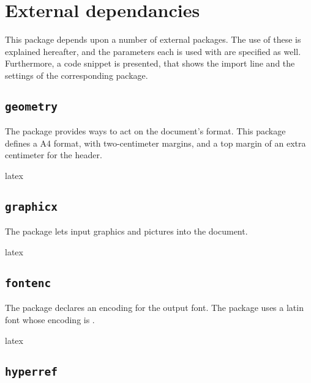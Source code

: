 \documentclass{report}
\begin{document}
\section{External dependancies}

This package depends upon a number of external packages.
The use of these is explained hereafter, and the parameters each is used with are specified as well.
Furthermore, a code snippet is presented, that shows the import line and the settings of the corresponding package.

\subsection{\texttt{geometry}}

The  package provides ways to act on the document's format.
This package defines a A4 format, with two-centimeter margins, and a top margin of an extra centimeter for the header.

\begin{imtaCode}{latex}
\RequirePackage[a4paper, margin=2cm, top=3cm]{geometry}
\end{imtaCode}


\subsection{\texttt{graphicx}}

The  package lets input graphics and pictures into the document.

\begin{imtaCode}{latex}
\RequirePackage{graphicx}
\end{imtaCode}


\subsection{\texttt{fontenc}}

The  package declares an encoding for the output font.
The  package uses a latin font whose encoding is .

\begin{imtaCode}{latex}
\RequirePackage[T1]{fontenc}
\end{imtaCode}


\subsection{\texttt{hyperref}}
\end{document}
